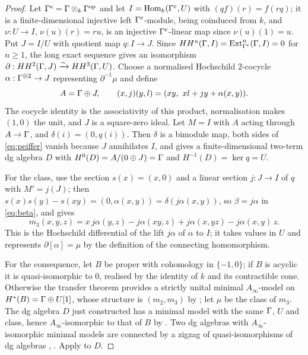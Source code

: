 \begin{proof}
Let \(\Gamma^e=\Gamma\otimes_k\Gamma^{\mathrm{op}}\) and let \(I=\operatorname{Hom}_k(\Gamma^e,U)\) with \((qf)(r)=f(rq)\); it is a finite-dimensional injective left \(\Gamma^e\)-module, being coinduced from \(k\), and \(\nu:U\to I\), \(\nu(u)(r)=ru\), is an injective \(\Gamma^e\)-linear map since \(\nu(u)(1)=u\).  Put \(J=I/U\) with quotient map \(q:I\to J\).  Since \(HH^n(\Gamma,I)=\operatorname{Ext}^n_{\Gamma^e}(\Gamma,I)=0\) for \(n\ge1\), the long exact sequence gives an isomorphism \(\partial:HH^2(\Gamma,J)\xrightarrow{\sim}HH^3(\Gamma,U)\).  Choose a normalised Hochschild \(2\)-cocycle \(\alpha:\Gamma^{\otimes2}\to J\) representing \(\partial^{-1}\mu\) and define
\[
 A=\Gamma\oplus J,\qquad (x,j)(y,l)=(xy,\ xl+jy+\alpha(x,y)).
\]
The cocycle identity is the associativity of this product, normalisation makes \((1,0)\) the unit, and \(J\) is a square-zero ideal.  Let \(M=I\) with \(A\) acting through \(A\to\Gamma\), and \(\delta(i)=(0,q(i))\).  Then \(\delta\) is a bimodule map, both sides of \eqref{eq:peiffer} vanish because \(J\) annihilates \(I\), and  gives a finite-dimensional two-term dg algebra \(D\) with \(H^0(D)=A/(0\oplus J)=\Gamma\) and \(H^{-1}(D)=\ker q=U\).

For the class, use the section \(s(x)=(x,0)\) and a linear section \(j:J\to I\) of \(q\) with \(M'=j(J)\); then \(s(x)s(y)-s(xy)=(0,\alpha(x,y))=\delta(j\alpha(x,y))\), so \(\beta=j\alpha\) in \eqref{eq:beta}, and  gives
\[
 m_3(x,y,z)=x\,j\alpha(y,z)-j\alpha(xy,z)+j\alpha(x,yz)-j\alpha(x,y)\,z .
\]
This is the Hochschild differential of the lift \(j\alpha\) of \(\alpha\) to \(I\); it takes values in \(U\) and represents \(\partial[\alpha]=\mu\) by the definition of the connecting homomorphism.

For the consequence, let \(B\) be proper with cohomology in \(\{-1,0\}\); if \(B\) is acyclic it is quasi-isomorphic to \(0\), realised by the identity of \(k\) and its contractible cone.  Otherwise the transfer theorem \cite[Section~3.3]{Keller01Ainf} provides a strictly unital minimal \(A_\infty\)-model on \(H^*(B)=\Gamma\oplus U[1]\), whose structure is \((m_2,m_3)\) by ; let \(\mu\) be the class of \(m_3\).  The dg algebra \(D\) just constructed has a minimal model with the same \(\Gamma\), \(U\) and class, hence \(A_\infty\)-isomorphic to that of \(B\) by .  Two dg algebras with \(A_\infty\)-isomorphic minimal models are connected by a zigzag of quasi-isomorphisms of dg algebras \cite[Section~3.3]{Keller01Ainf}, \cite[Section~1.3]{LefevreHasegawa03}.  Apply  to \(D\).
\end{proof}

